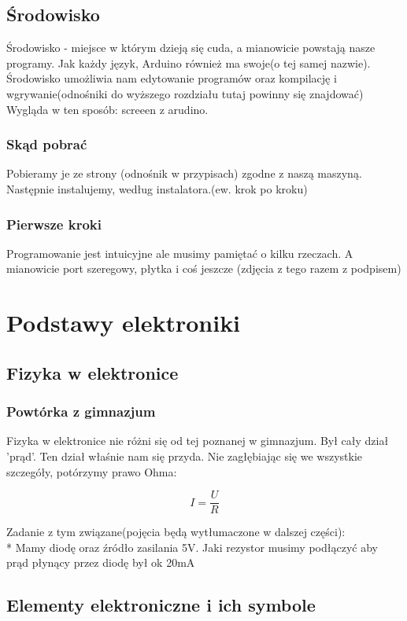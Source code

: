 	\subsection{Środowisko}
	Środowisko - miejsce w którym dzieją się cuda, a mianowicie powstają nasze programy. Jak każdy język, Arduino również ma swoje(o tej samej nazwie).
	Środowisko umożliwia nam edytowanie programów oraz kompilację i wgrywanie(odnośniki do wyższego rozdziału tutaj powinny się znajdować)
		Wygląda w ten sposób: screeen z arudino. 
	\subsubsection{Skąd pobrać}
		
Pobieramy je ze strony (odnośnik w przypisach) zgodne z naszą maszyną. Następnie instalujemy, według instalatora.(ew. krok po kroku) 
\subsubsection{Pierwsze kroki}
Programowanie jest intuicyjne ale musimy pamiętać o kilku rzeczach. A mianowicie port szeregowy, płytka i coś jeszcze
(zdjęcia z tego razem z podpisem)

\section{Podstawy elektroniki}
 \subsection{Fizyka w elektronice}
	\subsubsection{Powtórka z gimnazjum}
	Fizyka w elektronice nie różni się od tej poznanej w gimnazjum. Był cały dział 'prąd'. Ten dział właśnie nam się przyda. Nie zagłębiając się we wszystkie szczegóły, potórzymy prawo Ohma:
	\begin{center}
	\[
	I=\frac{U}{R}
	\]	
	\end{center}
Zadanie z tym związane(pojęcia będą wytłumaczone w dalszej części): \\* Mamy diodę oraz źródło zasilania 5V. Jaki rezystor musimy podłączyć aby prąd płynący przez diodę był ok 20mA %
	\subsection{Elementy elektroniczne i ich symbole}
